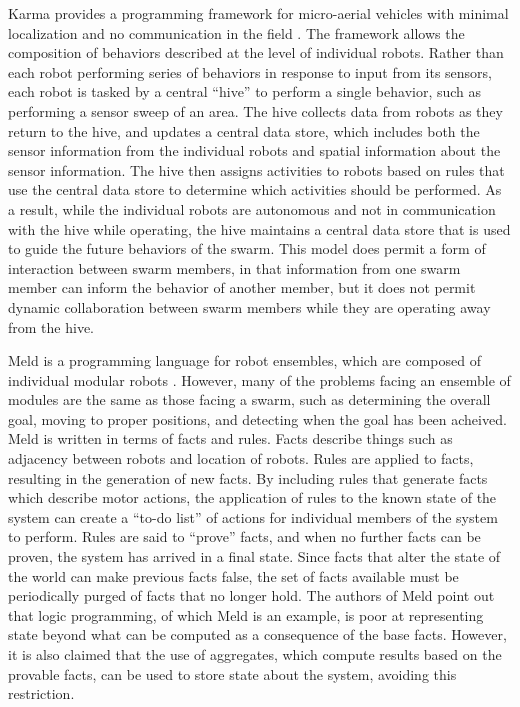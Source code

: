 \documentclass[]{article}
\begin{document}
Karma provides a programming framework for micro-aerial vehicles with minimal localization and no communication in the field \cite{dantu2011programming}.
The framework allows the composition of behaviors described at the level of individual robots. 
Rather than each robot performing series of behaviors in response to input from its sensors, each robot is tasked by a central ``hive'' to perform a single behavior, such as performing a sensor sweep of an area. 
The hive collects data from robots as they return to the hive, and updates a central data store, which includes both the sensor information from the individual robots and spatial information about the sensor information. 
The hive then assigns activities to robots based on rules that use the central data store to determine which activities should be performed. 
As a result, while the individual robots are autonomous and not in communication with the hive while operating, the hive maintains a central data store that is used to guide the future behaviors of the swarm. 
This model does permit a form of interaction between swarm members, in that information from one swarm member can inform the behavior of another member, but it does not permit dynamic collaboration between swarm members while they are operating away from the hive. 

Meld is a programming language for robot ensembles, which are composed of individual modular robots \cite{ashley2007meld}. 
However, many of the problems facing an ensemble of modules are the same as those facing a swarm, such as determining the overall goal, moving to proper positions, and detecting when the goal has been acheived. 
Meld is written in terms of facts and rules. 
Facts describe things such as adjacency between robots and location of robots. 
Rules are applied to facts, resulting in the generation of new facts. 
By including rules that generate facts which describe motor actions, the application of rules to the known state of the system can create a ``to-do list'' of actions for individual members of the system to perform. 
Rules are said to ``prove'' facts, and when no further facts can be proven, the system has arrived in a final state. 
Since facts that alter the state of the world can make previous facts false, the set of facts available must be periodically purged of facts that no longer hold. 
The authors of Meld point out that logic programming, of which Meld is an example, is poor at representing state beyond what can be computed as a consequence of the base facts. 
However, it is also claimed that the use of aggregates, which compute results based on the provable facts, can be used to store state about the system, avoiding this restriction. 
\end{document}
